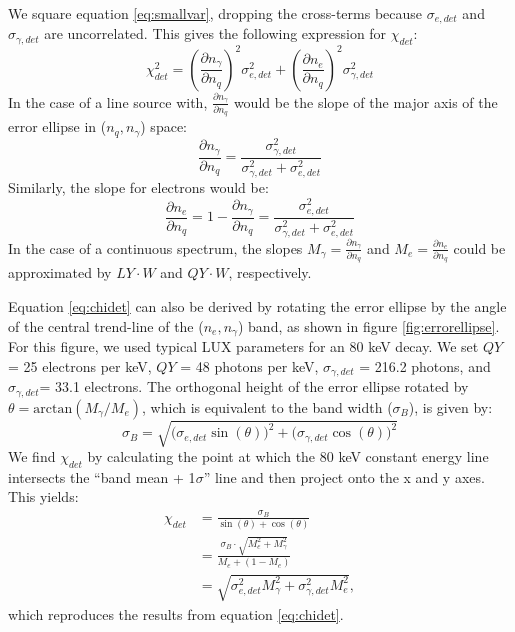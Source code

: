 We square equation \ref{eq:smallvar}, dropping the cross-terms because $\sigma_{e,det}$ and $\sigma_{\gamma,det}$ are uncorrelated. This gives the following expression for $\chi_{det}$:
\begin{equation}\label{eq:chidet}
\chi_{det}^2=\left(\frac{\partial n_{\gamma}}{\partial n_{q}}\right)^2\sigma_{e,det}^2+\left(\frac{\partial n_{e}}{\partial n_{q}}\right)^2\sigma_{\gamma,det}^2
\end{equation}
In the case of a line source with, $\frac{\partial n_{\gamma}}{\partial n_{q}}$ would be the slope of the major axis of the error ellipse in ($n_q,n_{\gamma}$) space:
\begin{equation}
\frac{\partial n_{\gamma}}{\partial n_{q}}= \frac{\sigma_{\gamma,det}^2}{\sigma_{\gamma,det}^2+\sigma_{e,det}^2}
\end{equation}
Similarly, the slope for electrons would be:
\begin{equation}
\frac{\partial n_{e}}{\partial n_{q}}=1-\frac{\partial n_{\gamma}}{\partial n_{q}}= \frac{\sigma_{e,det}^2}{\sigma_{\gamma,det}^2+\sigma_{e,det}^2}
\end{equation}
In the case of a continuous spectrum, the slopes $M_{\gamma}=\frac{\partial n_{\gamma}}{\partial n_{q}}$ and $M_{e}=\frac{\partial n_{e}}{\partial n_{q}}$ could be approximated by $LY\cdot W$ and $QY\cdot W$, respectively.

Equation \ref{eq:chidet} can also be derived by rotating the error ellipse by the angle of the central trend-line of the ($n_e,n_{\gamma}$) band, as shown in figure \ref{fig:errorellipse}. For this figure, we used typical LUX parameters for an 80 keV decay. We set $QY$ = 25 electrons per keV, $QY$ = 48 photons per keV, $\sigma_{\gamma,det}$ = 216.2 photons, and $\sigma_{\gamma,det}$= 33.1 electrons. The orthogonal height of the error ellipse rotated by $\theta=\text{arctan}(M_{\gamma}/M_{e})$, which is equivalent to the band width ($\sigma_B$), is given by:
\begin{equation}
\sigma_B=\sqrt{\Big(\sigma_{e,det}\sin(\theta)\Big)^2+\Big(\sigma_{\gamma,det}\cos(\theta)\Big)^2}
\end{equation}
We find $\chi_{det}$ by calculating the point at which the 80 keV constant energy line intersects the ``band mean + 1$\sigma$'' line and then project onto the x and y axes. This yields:
\begin{equation}
\begin{split}
\chi_{det}&=\frac{\sigma_B}{\sin(\theta)+\cos(\theta)}\\[1em]
&=\frac{\sigma_B\cdot \sqrt{M_e^2+M_{\gamma}^2}}{M_e+(1-M_e)}\\[1em]
&=\sqrt{\sigma_{e,det}^2M_{\gamma}^2+\sigma_{\gamma,det}^2M_{e}^2},
\end{split}
\end{equation}
which reproduces the results from equation \ref{eq:chidet}.

